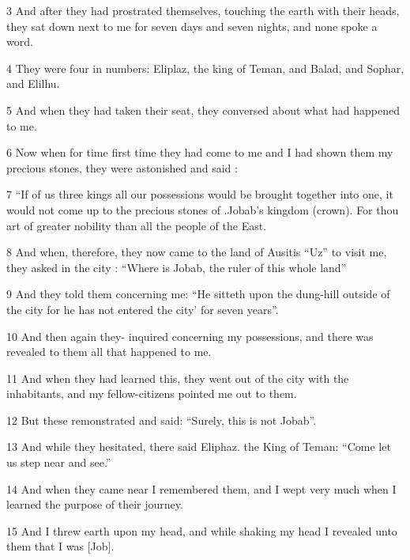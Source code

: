 \par 3 And after they had prostrated themselves, touching the earth with their heads, they sat down next to me for seven days and seven nights, and none spoke a word.

\par 4 They were four in numbers: Eliplaz, the king of Teman, and Balad, and Sophar, and Elilhu.

\par 5 And when they had taken their seat, they conversed about what had happened to me.

\par 6 Now when for time first time they had come to me and I had shown them my precious stones, they were astonished and said :

\par 7 “If of us three kings all our possessions would be brought together into one, it would not come up to the precious stones of .Jobab’s kingdom (crown). For thou art of greater nobility than all the people of the East.

\par 8 And when, therefore, they now came to the land of Ausitis “Uz” to visit me, they asked in the city : “Where is Jobab, the ruler of this whole land”

\par 9 And they told them concerning me: “He sitteth upon the dung-hill outside of the city for he has not entered the city’ for seven years”.

\par 10 And then again they- inquired concerning my possessions, and there was revealed to them all that happened to me.

\par 11 And when they had learned this, they went out of the city with the inhabitants, and my fellow-citizens pointed me out to them.

\par 12 But these remonstrated and said: “Surely, this is not Jobab”.

\par 13 And while they hesitated, there said Eliphaz. the King of Teman: “Come let us step near and see.”

\par 14 And when they came near I remembered them, and I wept very much when I learned the purpose of their journey.

\par 15 And I threw earth upon my head, and while shaking my head I revealed unto them that I was [Job].

